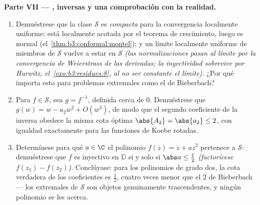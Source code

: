 \begin{problem}
\begin{enumerate}[resume]
\end{enumerate}
\medskip
\noindent\textbf{Parte VII --- , inversas y una comprobación
con la realidad.}
\begin{enumerate}[resume]
  \item Demuéstrese que la clase $\mathcal S$ es
  \emph{compacta} para la convergencia
  localmente uniforme: está localmente acotada por el teorema de
  crecimiento, luego es normal (el~\cref{thm:b3:conformal:montel}); y un
  límite localmente uniforme de miembros de $\mathcal S$ vuelve a estar
  en $\mathcal S$ \emph{(las normalizaciones pasan al límite por la
  convergencia de Weierstrass de las derivadas; la inyectividad
  sobrevive por Hurwitz, el~\cref{exo:b3:residues:8}, al no ser
  constante el límite)}. ¿Por qué importa esto para problemas extremales
  como el de Bieberbach? \item Para $f \in \mathcal S$, sea
  $g = f^{-1}$, definida cerca de $0$. Demuéstrese que
  $g(w) = w - a_2w^2 + O(w^3)$, de modo que el segundo coeficiente de la
  inversa obedece la misma cota óptima $\abs{A_2} = \abs{a_2} \leq 2$,
  con igualdad exactamente para las funciones de Koebe rotadas. \item
  Determínese para qué $a \in \C$ el polinomio $f(z)
        = z + az^2$ pertenece a $\mathcal S$: demuéstrese que $f$ es
  inyectivo en $\mathbb D$ si y solo si $\abs a \leq \frac12$
  \emph{(factorícese $f(z_1) - f(z_2)$)}. Conclúyase: para los
  polinomios de grado dos, la cota verdadera de los coeficientes es
  $\frac12$, cuatro veces menor que el $2$ de Bieberbach --- los
  extremales de $\mathcal S$ son objetos genuinamente trascendentes, y
  ningún polinomio se les acerca.
\end{enumerate}
\end{problem}
